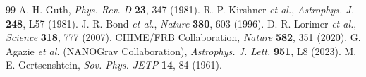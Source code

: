 \documentclass[reprint,amsmath,amssymb,aps,prd]{revtex4-2}
\begin{document}
\begin{thebibliography}{99}
 A. H. Guth, \textit{Phys. Rev. D} \textbf{23}, 347 (1981).
 R. P. Kirshner \textit{et al.}, \textit{Astrophys. J.} \textbf{248}, L57 (1981).
 J. R. Bond \textit{et al.}, \textit{Nature} \textbf{380}, 603 (1996).
 D. R. Lorimer \textit{et al.}, \textit{Science} \textbf{318}, 777 (2007).
 CHIME/FRB Collaboration, \textit{Nature} \textbf{582}, 351 (2020).
 G. Agazie \textit{et al.} (NANOGrav Collaboration), \textit{Astrophys. J. Lett.} \textbf{951}, L8 (2023).
 M. E. Gertsenshtein, \textit{Sov. Phys. JETP} \textbf{14}, 84 (1961).
\end{thebibliography}
\end{document}
